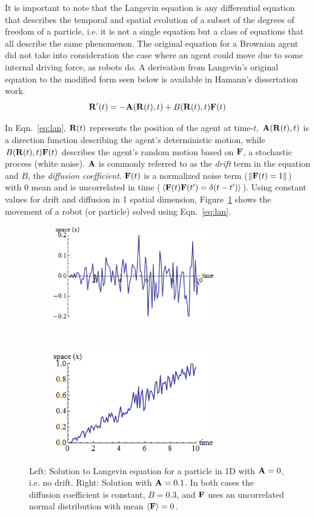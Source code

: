 \documentclass[Main.tex]{subfiles}
\begin{document}
It is important to note that the Langevin equation is any differential equation that describes the temporal and spatial evolution of a subset of the degrees of freedom of a particle, i.e. it is not a single equation but a class of equations that all describe the same phenomenon. The original equation for a Brownian agent did not take into consideration the case where an agent could move due to some internal driving force, as robots do. A derivation from Langevin's original equation to the modified form seen below is available in Hamann's dissertation work\cite{Hamann2010}.
\begin{equation}\label{eq:lan}
\mathbf{R}'(t) = -\mathbf{A}(\mathbf{R}(t),t) + B(\mathbf{R}(t),t)\mathbf{F}(t)
\end{equation}

In Eqn.~\eqref{eq:lan}, $\mathbf{R}(t)$ represents the position of the agent at time-$t$, $\mathbf{A}(\mathbf{R}(t),t)$ is a direction function describing the agent's deterministic motion, while $B(\mathbf{R}(t),t)\mathbf{F}(t)$ describes the agent's random motion based on $\mathbf{F}$, a stochastic process (white noise). $\mathbf{A}$ is commonly referred to as the \emph{drift} term in the equation and $B$, the \emph{diffusion coefficient}. $\mathbf{F}(t)$ is a normalized noise term ($\lVert\mathbf{F}(t) = 1\rVert$) with 0 mean and is uncorrelated in time ($\left<\mathbf{F}(t)\mathbf{F}(t') = \delta(t - t')\right>$). Using constant values for drift and diffusion in 1 spatial dimension, Figure~\ref{fig:lan} shows the movement of a robot (or particle) solved using Eqn.~\eqref{eq:lan}.

\begin{figure}[!ht]
\centering\begin{subfigure}{.5\textwidth}
\centering\includegraphics[width=7cm]{assets/LanNoDrift.png}
\end{subfigure}~
\centering\begin{subfigure}{.5\textwidth}
\centering\includegraphics[width=7cm]{assets/LanDrift.png}
\end{subfigure}
\caption{Left: Solution to Langevin equation for a particle in 1D with $\mathbf{A} = 0$, i.e. no drift. Right: Solution with $\mathbf{A} = 0.1$. In both cases the diffusion coefficient is constant, $B = 0.3$, and $\mathbf{F}$ uses an uncorrelated normal distribution with mean $\left<\mathbf{F}\right> = 0$.}\label{fig:lan}
\end{figure}
\end{document}
